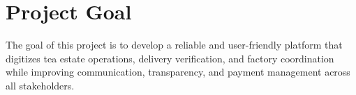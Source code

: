 \section{Project Goal}
\label{sec:project_goal}

The goal of this project is to develop a reliable and user-friendly platform that digitizes tea estate operations, delivery verification, and factory coordination while improving communication, transparency, and payment management across all stakeholders.